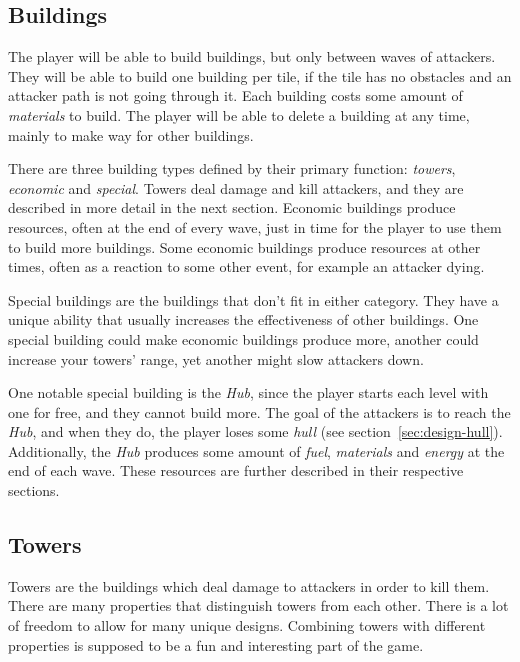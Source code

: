 \subsection{Buildings}\label{sec:design-buildings}

The player will be able to build buildings, but only between waves of attackers.
They will be able to build one building per tile, if the tile has no obstacles and an attacker path is not going through it.
Each building costs some amount of \emph{materials} to build.
The player will be able to delete a building at any time, mainly to make way for other buildings.

There are three building types defined by their primary function: \emph{towers}, \emph{economic} and \emph{special}.
Towers deal damage and kill attackers, and they are described in more detail in the next section.
Economic buildings produce resources, often at the end of every wave, just in time for the player to use them to build more buildings.
Some economic buildings produce resources at other times, often as a reaction to some other event, for example an attacker dying.

Special buildings are the buildings that don't fit in either category.
They have a unique ability that usually increases the effectiveness of other buildings.
One special building could make economic buildings produce more, another could increase your towers' range, yet another might slow attackers down.

One notable special building is the \emph{Hub}, since the player starts each level with one for free, and they cannot build more.
The goal of the attackers is to reach the \emph{Hub}, and when they do, the player loses some \emph{hull} (see section~\ref{sec:design-hull}).
Additionally, the \emph{Hub} produces some amount of \emph{fuel}, \emph{materials} and \emph{energy} at the end of each wave.
These resources are further described in their respective sections.

\subsection{Towers}\label{sec:design-towers}

Towers are the buildings which deal damage to attackers in order to kill them.
There are many properties that distinguish towers from each other.
There is a lot of freedom to allow for many unique designs.
Combining towers with different properties is supposed to be a fun and interesting part of the game.

